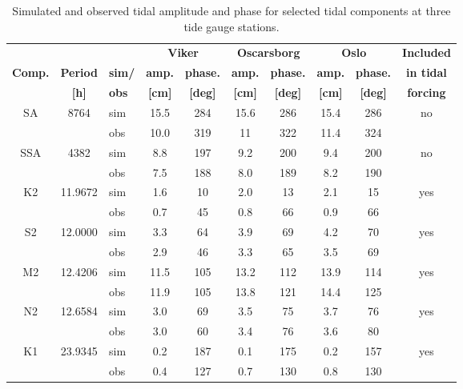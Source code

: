 \begin{table}[t] 
	\caption{\small Simulated and observed tidal amplitude and phase for selected tidal components at three tide gauge stations.} 
	\label{tab:Tide} 
	\centering 
	\begin{tabular}{|c|c|l|cc|cc|cc|c|} 
\hline  
	  &	&	& \multicolumn{2}{|c|}{\small \bf Viker} & \multicolumn{2}{|c|}{\small \bf Oscarsborg} & \multicolumn{2}{|c|}{\small \bf Oslo} & {\small \bf Included} \\  
{\small \bf Comp.} & {\small \bf Period} & {\small \bf sim/} & {\small \bf amp.} & {\small \bf phase.} & {\small \bf amp.} & {\small \bf phase.} & {\small \bf amp.} & {\small \bf phase.} & {\small \bf in tidal} \\ 
	    & {\small \bf [h]} & {\small \bf obs} & {\small \bf [cm]} & {\small \bf [deg]} & {\small \bf [cm]} & {\small \bf [deg]} & {\small \bf [cm]}   & {\small \bf [deg]} & {\small \bf forcing} \\ \hline 
\small SA   & \small 8764	 	& sim & 15.5 & 284 & 15.6 & 286 & 15.4 & 286 & no   \\
\small      &        	& obs & 10.0 & 319 & 11 & 322 & 11.4 & 324 &    \\
\small SSA  & \small 4382 		& sim & 8.8 & 197 & 9.2 & 200 & 9.4 & 200 & no   \\
\small      &        	& obs & 7.5 & 188 & 8.0 & 189 & 8.2 & 190 &    \\
\small K2   & \small 11.9672 	& sim & 1.6 & 10 & 2.0 & 13 & 2.1 & 15 & yes  \\
\small      &        	& obs & 0.7 & 45 & 0.8 & 66 & 0.9 & 66 &    \\
\small S2   & \small 12.0000 	& sim & 3.3 & 64 & 3.9 & 69 & 4.2 & 70 & yes  \\
\small      &        	& obs & 2.9 & 46 & 3.3 & 65 & 3.5 & 69 &    \\
\small M2   & \small 12.4206 	& sim & 11.5 & 105 & 13.2 & 112 & 13.9 & 114 & yes  \\
\small      &        	& obs & 11.9 & 105 & 13.8 & 121 & 14.4 & 125 &    \\
\small N2   & \small 12.6584 	& sim & 3.0 & 69 & 3.5 & 75 & 3.7 & 76 & yes  \\
\small      &        	& obs & 3.0 & 60 & 3.4 & 76 & 3.6 & 80 &    \\
\small K1   & \small 23.9345 	& sim & 0.2 & 187 & 0.1 & 175 & 0.2 & 157 & yes  \\
\small      &        	& obs & 0.4 & 127 & 0.7 & 130 & 0.8 & 130 &    \\

\end{tabular}
\end{table}

